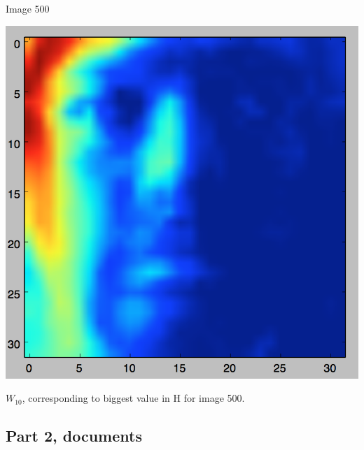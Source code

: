\documentclass[11pt]{article}
\begin{document}
Image 500

\includegraphics[scale=.5]{images/img500_W10}

$W_{10}$, corresponding to biggest value in H for image 500.

\subsection*{Part 2, documents}
\end{document}
